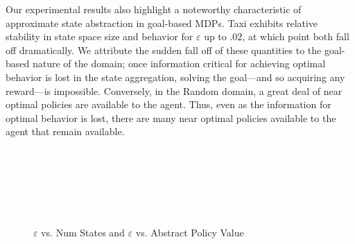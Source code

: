 Our experimental results also highlight a noteworthy characteristic of approximate state abstraction in goal-based \acp{MDP}. Taxi exhibits relative stability in state space size and behavior for $\varepsilon$ up to $.02$, at which point both fall off dramatically. We attribute the sudden fall off of these quantities to the goal-based nature of the domain; once information critical for achieving optimal behavior is lost in the state aggregation, solving the goal---and so acquiring any reward---is impossible. Conversely, in the Random domain, a great deal of near optimal policies are available to the agent. Thus, even as the information for optimal behavior is lost, there are many near optimal policies available to the agent that remain available. 

\begin{figure*}
\centering
{}
 \\
 \\
 \\
 \\
 \\
\caption{$\varepsilon$ vs. Num States and $\varepsilon$ vs. Abstract Policy Value\label{fig:main_empirical_results1}}
\end{figure*}

